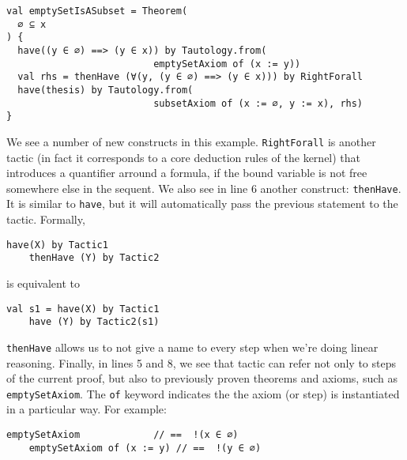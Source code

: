 \noindent\begin{minipage}{\linewidth}\vspace{1em}
  \begin{lstlisting}[language=lisa, frame=single]
val emptySetIsASubset = Theorem(
  ∅ ⊆ x
) {
  have((y ∈ ∅) ==> (y ∈ x)) by Tautology.from(
                          emptySetAxiom of (x := y))
  val rhs = thenHave (∀(y, (y ∈ ∅) ==> (y ∈ x))) by RightForall
  have(thesis) by Tautology.from(
                          subsetAxiom of (x := ∅, y := x), rhs)
}
  \end{lstlisting}
\end{minipage}
We see a number of new constructs in this example. \lstinline|RightForall| is another tactic (in fact it corresponds to a core deduction rules of the kernel) that introduces a quantifier arround a formula, if the bound variable is not free somewhere else in the sequent.
We also see in line 6 another construct: \lstinline|thenHave|. It is similar to \lstinline|have|, but it will automatically pass the previous statement to the tactic. Formally,
\noindent\begin{minipage}{\linewidth}\vspace{1em}
  \begin{lstlisting}[language=lisa, frame=single]
    have(X) by Tactic1
    thenHave (Y) by Tactic2
  \end{lstlisting}
\end{minipage}
is equivalent to

\noindent\begin{minipage}{\linewidth}\vspace{1em}
  \begin{lstlisting}[language=lisa, frame=single]
    val s1 = have(X) by Tactic1
    have (Y) by Tactic2(s1)
  \end{lstlisting}
\end{minipage}
\lstinline|thenHave| allows us to not give a name to every step when we're doing linear reasoning. Finally, in lines 5 and 8, we see that tactic can refer not only to steps of the current proof, but also to previously proven theorems and axioms, such as \lstinline|emptySetAxiom|. The \lstinline|of| keyword indicates the the axiom (or step) is instantiated in a particular way. For example:
\noindent\begin{minipage}{\linewidth}\vspace{1em}
  \begin{lstlisting}[language=lisa, frame=single]
    emptySetAxiom             // ==  !(x ∈ ∅)
    emptySetAxiom of (x := y) // ==  !(y ∈ ∅)
  \end{lstlisting}
\end{minipage}

